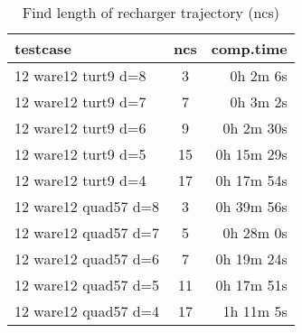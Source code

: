 \documentclass{article}
\begin{document}
\begin{table}[h!]
  \begin{center}
    \caption{Find length of recharger trajectory (ncs)}
    \label{tab:table1}
    \begin{tabular}{l|c|r}
      \textbf{testcase} & \textbf{ncs} & \textbf{comp.time}\\
      \hline
       12 ware12 turt9
 d=8 & 3 & 0h 2m 6s \\
       12 ware12 turt9
 d=7 & 7 & 0h 3m 2s \\
       12 ware12 turt9
 d=6 & 9 & 0h 2m 30s \\
       12 ware12 turt9
 d=5 & 15 & 0h 15m 29s \\
       12 ware12 turt9
 d=4 & 17 & 0h 17m 54s \\
      \hline
       12 ware12 quad57 d=8 & 3 & 0h 39m 56s \\
       12 ware12 quad57 d=7 & 5 & 0h 28m 0s \\
       12 ware12 quad57 d=6 & 7 & 0h 19m 24s \\
       12 ware12 quad57 d=5 & 11 & 0h 17m 51s \\
       12 ware12 quad57 d=4 & 17 & 1h 11m 5s \\
    \end{tabular}
  \end{center}
\end{table}
\end{document}
